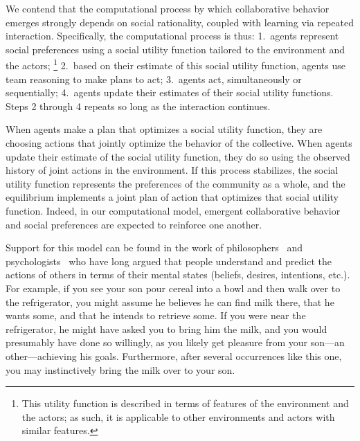We contend that the computational process by which collaborative
behavior emerges strongly depends on social rationality, coupled with
learning via repeated interaction.
%
Specifically, the computational process is thus:
1.~agents represent social preferences using a social utility function
tailored to the environment and the actors;%
\footnote{This utility function is described in terms of features of the environment and the actors;
as such, it is applicable to other environments and actors with similar features.}
2.~based on their estimate of this social utility function, agents use team reasoning to make plans to act;
3.~agents act, simultaneously or sequentially;
4.~agents update their estimates of their social utility functions.
Steps 2 through 4 repeats so long as the interaction continues.

When agents
make a plan that optimizes a social
utility function, they are choosing actions that jointly optimize the
behavior of the collective.
When agents update their estimate of the social utility function, they
do so using the observed history of joint actions in the environment.
If this process stabilizes, the social utility function represents the
preferences of the community as a whole, 
and the equilibrium implements a joint plan of action that optimizes
that social utility function.  Indeed, in our computational model,
emergent collaborative behavior and social preferences are expected to
reinforce one another.

Support for this model can be found in the work of
philosophers~\cite{dennett87} and psychologists~\cite{heider44} who
have long argued that people understand and predict the actions of
others in terms of their  mental states (beliefs, desires, intentions,
etc.).  For example, if you see your son pour cereal into a bowl and
then walk over to the refrigerator, you might assume he believes he
can find milk there, that he wants some, and that he intends to
retrieve some.  If you were near the refrigerator, he might have asked
you to bring him the milk, and you would presumably have done so
willingly, as you likely get pleasure from your son---an
other---achieving his goals.  Furthermore, after several occurrences
like this one, you may instinctively bring the milk over to your son.

